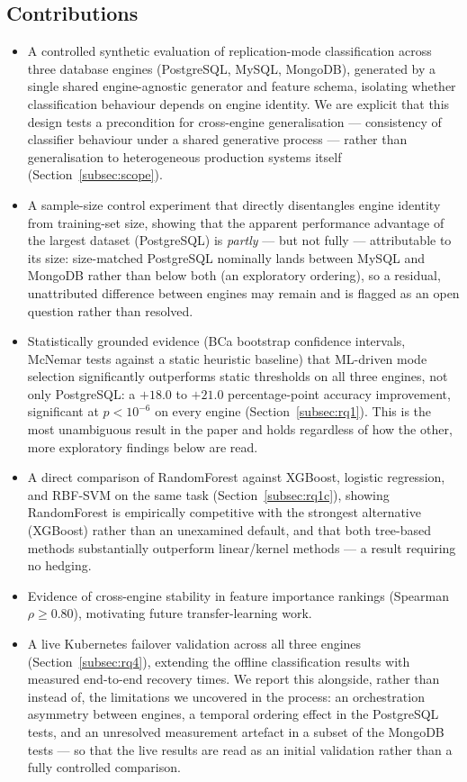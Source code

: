 \documentclass[iicol,pdflatex,sn-mathphys-num]{sn-jnl}
\theoremstyle{thmstyleone}
\theoremstyle{thmstylethree}
\begin{document}
\subsection{Contributions}\label{subsec:contributions}

\begin{itemize}
\item A controlled synthetic evaluation of replication-mode
  classification across three database engines (PostgreSQL, MySQL,
  MongoDB), generated by a single shared engine-agnostic generator and
  feature schema, isolating whether classification behaviour depends
  on engine identity. We are explicit that this design tests a
  precondition for cross-engine generalisation --- consistency of
  classifier behaviour under a shared generative process --- rather
  than generalisation to heterogeneous production systems itself
  (Section~\ref{subsec:scope}).
\item A sample-size control experiment that directly disentangles
  engine identity from training-set size, showing that the apparent
  performance advantage of the largest dataset (PostgreSQL) is
  \emph{partly} --- but not fully --- attributable to its size:
  size-matched PostgreSQL nominally lands between MySQL and MongoDB rather
  than below both (an exploratory ordering), so a residual, unattributed
  difference between engines may remain and is flagged as an open question rather than resolved.
\item Statistically grounded evidence (BCa bootstrap confidence
  intervals, McNemar tests against a static heuristic baseline) that
  ML-driven mode selection significantly outperforms static thresholds
  on all three engines, not only PostgreSQL: a $+18.0$ to $+21.0$
  percentage-point accuracy improvement, significant at
  $p<10^{-6}$ on every engine (Section~\ref{subsec:rq1}). This is the
  most unambiguous result in the paper and holds regardless of how
  the other, more exploratory findings below are read.
\item A direct comparison of RandomForest against XGBoost, logistic
  regression, and RBF-SVM on the same task (Section~\ref{subsec:rq1c}),
  showing RandomForest is empirically competitive with the strongest
  alternative (XGBoost) rather than an unexamined default, and that
  both tree-based methods substantially outperform linear/kernel
  methods --- a result requiring no hedging.
\item Evidence of cross-engine stability in feature importance rankings
  (Spearman $\rho \geq 0.80$), motivating future transfer-learning work.
\item A live Kubernetes failover validation across all three engines
  (Section~\ref{subsec:rq4}), extending the offline classification
  results with measured end-to-end recovery times. We report this
  alongside, rather than instead of, the limitations we uncovered in
  the process: an orchestration asymmetry between engines, a
  temporal ordering effect in the PostgreSQL tests, and an unresolved
  measurement artefact in a subset of the MongoDB tests --- so that
  the live results are read as an initial validation rather than a
  fully controlled comparison.
\end{itemize}
\end{document}
